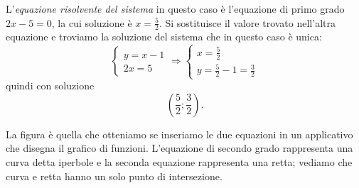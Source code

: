 \begin{exrig}
\begin{esempio}
L'\emph{equazione risolvente del sistema} in questo caso è l'equazione di primo 
grado $2x-5=0$, la cui soluzione è $x=\frac 5 2$. Si sostituisce il valore 
trovato nell'altra equazione e troviamo la soluzione del sistema che in questo 
caso è unica: 
\[\left\{\begin{array}{l}y=x-1 \\2x=5\end{array}\right. 
\Rightarrow\left\{\begin{array}{l}x=\frac 5 2 \\
y=\frac 5 2-1=\frac 3 2\end{array}\right.\] 
quindi con soluzione \[\left(\frac 5 2;\frac 3 2\right).\]

\begin{multicols}{2}
La figura è quella che otteniamo se inseriamo le due equazioni in un applicativo 
che disegna il grafico di funzioni. L'equazione di secondo grado rappresenta 
una curva detta iperbole e la seconda equazione rappresenta una retta; 
vediamo che curva e retta hanno un solo punto di intersezione.
\begin{center}

\end{center}
\end{multicols}
\end{esempio}
\end{exrig}
% 
